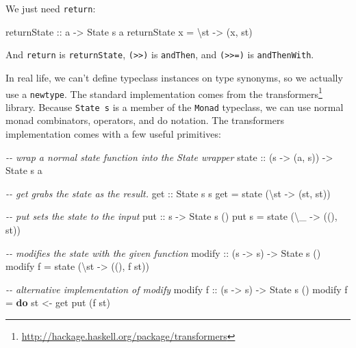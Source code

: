 \documentclass[]{article}
\newenvironment{Shaded}{}{}
\newcommand{\CommentTok}[1]{\textcolor[rgb]{0.38,0.63,0.69}{\textit{#1}}}
\newcommand{\DataTypeTok}[1]{\textcolor[rgb]{0.56,0.13,0.00}{#1}}
\newcommand{\KeywordTok}[1]{\textcolor[rgb]{0.00,0.44,0.13}{\textbf{#1}}}
\newcommand{\NormalTok}[1]{#1}
\newcommand{\OtherTok}[1]{\textcolor[rgb]{0.00,0.44,0.13}{#1}}
\renewcommand{\href}[2]{#2\footnote{\url{#1}}}
\begin{document}
We just need \texttt{return}:

\begin{Shaded}
\begin{Highlighting}[]
\OtherTok{returnState ::}\NormalTok{ a }\OtherTok{{-}\textgreater{}} \DataTypeTok{State}\NormalTok{ s a}
\NormalTok{returnState x }\OtherTok{=}\NormalTok{ \textbackslash{}st }\OtherTok{{-}\textgreater{}}\NormalTok{ (x, st)}
\end{Highlighting}
\end{Shaded}

And \texttt{return} is \texttt{returnState},
\texttt{(\textgreater{}\textgreater{})} is \texttt{andThen}, and
\texttt{(\textgreater{}\textgreater{}=)} is \texttt{andThenWith}.

In real life, we can't define typeclass instances on type synonyms, so we
actually use a \texttt{newtype}. The standard implementation comes from the
\href{http://hackage.haskell.org/package/transformers}{transformers} library.
Because \texttt{State\ s} is a member of the \texttt{Monad} typeclass, we can
use normal monad combinators, operators, and do notation. The transformers
implementation comes with a few useful primitives:

\begin{Shaded}
\begin{Highlighting}[]
\CommentTok{{-}{-} wrap a normal state function into the State wrapper}
\OtherTok{state ::}\NormalTok{ (s }\OtherTok{{-}\textgreater{}}\NormalTok{ (a, s)) }\OtherTok{{-}\textgreater{}} \DataTypeTok{State}\NormalTok{ s a}

\CommentTok{{-}{-} get grabs the state as the result.}
\OtherTok{get ::} \DataTypeTok{State}\NormalTok{ s s}
\NormalTok{get }\OtherTok{=}\NormalTok{ state (\textbackslash{}st }\OtherTok{{-}\textgreater{}}\NormalTok{ (st, st))}

\CommentTok{{-}{-} put sets the state to the input}
\OtherTok{put ::}\NormalTok{ s }\OtherTok{{-}\textgreater{}} \DataTypeTok{State}\NormalTok{ s ()}
\NormalTok{put s }\OtherTok{=}\NormalTok{ state (\textbackslash{}\_ }\OtherTok{{-}\textgreater{}}\NormalTok{ ((), st))}

\CommentTok{{-}{-} modifies the state with the given function}
\OtherTok{modify ::}\NormalTok{ (s }\OtherTok{{-}\textgreater{}}\NormalTok{ s) }\OtherTok{{-}\textgreater{}} \DataTypeTok{State}\NormalTok{ s ()}
\NormalTok{modify f }\OtherTok{=}\NormalTok{ state (\textbackslash{}st }\OtherTok{{-}\textgreater{}}\NormalTok{ ((), f st))}

\CommentTok{{-}{-} alternative implementation of \textasciigrave{}modify\textasciigrave{}}
\NormalTok{modify\textquotesingle{}}\OtherTok{ f ::}\NormalTok{ (s }\OtherTok{{-}\textgreater{}}\NormalTok{ s) }\OtherTok{{-}\textgreater{}} \DataTypeTok{State}\NormalTok{ s ()}
\NormalTok{modify\textquotesingle{} f }\OtherTok{=} \KeywordTok{do}
\NormalTok{    st }\OtherTok{\textless{}{-}}\NormalTok{ get}
\NormalTok{    put (f st)}
\end{Highlighting}
\end{Shaded}
\end{document}
